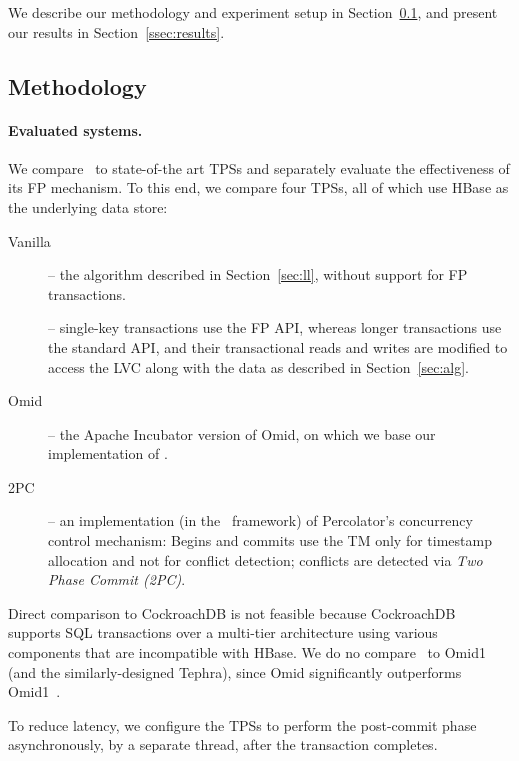 

We describe our methodology and experiment setup in Section~\ref{ssec:methodology}, and present our results 
in Section~\ref{ssec:results}.

\subsection{Methodology}
\label{ssec:methodology}

\paragraph{Evaluated systems.}

We compare \sys\  to  state-of-the art TPSs and separately evaluate the effectiveness of its FP mechanism.
To this end, we compare four TPSs, all of which use HBase as the underlying data store:
\begin{description}
\item[Vanilla \sys] -- the algorithm described in Section~\ref{sec:ll}, without support for FP transactions.
\item[\sys] -- single-key transactions use the FP API, 
whereas longer transactions use the standard API, 
and their transactional reads and writes are modified to access the LVC along with the data as described in Section~\ref{sec:alg}.
\item[Omid] -- the Apache Incubator version of Omid, on which we base our implementation of \sys. 
\item[2PC] -- an implementation (in the \sys\ framework) of Percolator's concurrency control mechanism:
Begins and commits use the TM only for timestamp allocation and not for conflict detection; conflicts are detected via 
\emph{Two Phase Commit (2PC)}.
\end{description}

Direct comparison to CockroachDB is not feasible because CockroachDB supports SQL transactions over a multi-tier
architecture using various components that are incompatible with HBase. 
We do no compare \sys\ to Omid1 (and the similarly-designed Tephra), since Omid significantly
outperforms Omid1~\cite{Omid2017}.

To reduce latency, we configure the TPSs to perform the post-commit phase asynchronously, 
by a separate thread, after the transaction completes.


